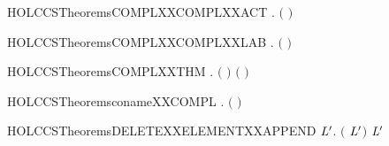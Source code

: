 \newcommand{\HOLCCSTheoremsCCSXXSubstXXvarXXfix}{\UseVerbatim{HOLCCSTheoremsCCSXXSubstXXvarXXfix}}
\begin{SaveVerbatim}{HOLCCSTheoremsCOMPLXXCOMPLXXACT}
\HOLTokenTurnstile{} \HOLSymConst{\HOLTokenForall{}}.  \ensuremath{(} \ensuremath{)} \HOLSymConst{\ensuremath{=}} 
\end{SaveVerbatim}
\newcommand{\HOLCCSTheoremsCOMPLXXCOMPLXXACT}{\UseVerbatim{HOLCCSTheoremsCOMPLXXCOMPLXXACT}}
\begin{SaveVerbatim}{HOLCCSTheoremsCOMPLXXCOMPLXXLAB}
\HOLTokenTurnstile{} \HOLSymConst{\HOLTokenForall{}}.  \ensuremath{(} \ensuremath{)} \HOLSymConst{\ensuremath{=}} 
\end{SaveVerbatim}
\newcommand{\HOLCCSTheoremsCOMPLXXCOMPLXXLAB}{\UseVerbatim{HOLCCSTheoremsCOMPLXXCOMPLXXLAB}}
\begin{SaveVerbatim}{HOLCCSTheoremsCOMPLXXTHM}
\HOLTokenTurnstile{} \HOLSymConst{\HOLTokenForall{}} .
     \ensuremath{(} \HOLSymConst{\HOLTokenNotEqual{}}   \HOLSymConst{\HOLTokenImp{}}   \HOLSymConst{\HOLTokenNotEqual{}}  \ensuremath{)} \HOLSymConst{\HOLTokenConj{}}
     \ensuremath{(} \HOLSymConst{\HOLTokenNotEqual{}}   \HOLSymConst{\HOLTokenImp{}}   \HOLSymConst{\HOLTokenNotEqual{}}  \ensuremath{)}
\end{SaveVerbatim}
\newcommand{\HOLCCSTheoremsCOMPLXXTHM}{\UseVerbatim{HOLCCSTheoremsCOMPLXXTHM}}
\begin{SaveVerbatim}{HOLCCSTheoremsconameXXCOMPL}
\HOLTokenTurnstile{} \HOLSymConst{\HOLTokenForall{}}.   \HOLSymConst{\ensuremath{=}}  \ensuremath{(} \ensuremath{)}
\end{SaveVerbatim}
\newcommand{\HOLCCSTheoremsconameXXCOMPL}{\UseVerbatim{HOLCCSTheoremsconameXXCOMPL}}
\begin{SaveVerbatim}{HOLCCSTheoremsDELETEXXELEMENTXXAPPEND}
\HOLTokenTurnstile{} \HOLSymConst{\HOLTokenForall{}}  \ensuremath{\HOLBoundVar{L}\sp{\prime{}}}.
       \ensuremath{(} \HOLSymConst{++} \ensuremath{\HOLBoundVar{L}\sp{\prime{}}}\ensuremath{)} \HOLSymConst{\ensuremath{=}}
        \HOLSymConst{++}   \ensuremath{\HOLBoundVar{L}\sp{\prime{}}}
\end{SaveVerbatim}
